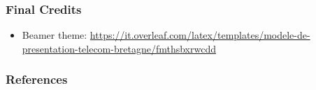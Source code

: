 \documentclass[c,10pt,pdftex]{beamer}
\begin{document}
\begin{frame}
\frametitle{Final Credits}
\vspace{-0.75cm}
\begin{itemize}
	\setlength\itemsep{1em}
	\item Beamer theme: \href{https://it.overleaf.com/latex/templates/modele-de-presentation-telecom-bretagne/fmthsbxrwcdd}{https://it.overleaf.com/latex/templates/modele-de-presentation-telecom-bretagne/fmthsbxrwcdd}
\end{itemize}
\end{frame}

\begin{frame}[t,allowframebreaks]
\nocite{*}
\frametitle{References}
\printbibliography
\end{frame}
\end{document}
